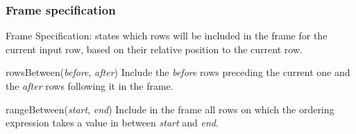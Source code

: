 \documentclass[english,serif,mathserif]{beamer}
\begin{document}
\begin{frame}[fragile]
  \frametitle{Frame specification}
  Frame Specification: states which rows will be included in the frame for the
  current input row, based on their relative position to the current row.

  \+
  \begin{describe}{rowsBetween(\emph{before}, \emph{after})}
    Include the \emph{before} rows preceding the current one and the \emph{after}
    rows following it in the frame.
  \end{describe}

  \+
  \begin{describe}{rangeBetween(\emph{start}, \emph{end})}
    Include in the frame all rows on which the ordering expression takes a
    value in between \emph{start} and \emph{end}.
  \end{describe}
\end{frame}
\end{document}
